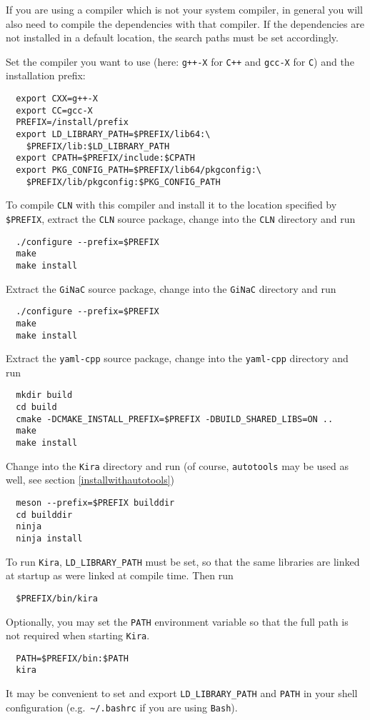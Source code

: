 \documentclass[a4paper,12pt]{article}
\newcommand*{\kira}{\texttt{Kira}}
\begin{document}
If you are using a compiler which is not your system compiler, in general you
will also need to compile the dependencies with that compiler.
If the dependencies are not installed in a default location, the search paths
must be set accordingly.

Set the compiler you want to use (here: \texttt{g++-X} for \texttt{C++} and
\texttt{gcc-X} for \texttt{C}) and the installation prefix:
%
\begin{verbatim}
  export CXX=g++-X
  export CC=gcc-X
  PREFIX=/install/prefix
  export LD_LIBRARY_PATH=$PREFIX/lib64:\
    $PREFIX/lib:$LD_LIBRARY_PATH
  export CPATH=$PREFIX/include:$CPATH
  export PKG_CONFIG_PATH=$PREFIX/lib64/pkgconfig:\
    $PREFIX/lib/pkgconfig:$PKG_CONFIG_PATH
\end{verbatim}
%
To compile \texttt{CLN} with this compiler and install it to the location
specified by \texttt{\$PREFIX}, extract the \texttt{CLN} source package, change
into the \texttt{CLN} directory and run
%
\begin{verbatim}
  ./configure --prefix=$PREFIX
  make
  make install
\end{verbatim}

\clearpage

\noindent
Extract the \texttt{GiNaC} source package, change into the \texttt{GiNaC}
directory and run
%
\begin{verbatim}
  ./configure --prefix=$PREFIX
  make
  make install
\end{verbatim}
%
Extract the \texttt{yaml-cpp} source package, change into the \texttt{yaml-cpp}
directory and run
%
\begin{verbatim}
  mkdir build
  cd build
  cmake -DCMAKE_INSTALL_PREFIX=$PREFIX -DBUILD_SHARED_LIBS=ON ..
  make
  make install
\end{verbatim}
%
Change into the \texttt{\kira{}} directory and run (of course,
\texttt{autotools} may be used as well, see section \ref{installwithautotools})
%
\begin{verbatim}
  meson --prefix=$PREFIX builddir
  cd builddir
  ninja
  ninja install
\end{verbatim}
%
To run \texttt{\kira{}}, \texttt{LD\_LIBRARY\_PATH} must be set, so that the same
libraries are linked at startup as were linked at compile time.
Then run
%
\begin{verbatim}
  $PREFIX/bin/kira
\end{verbatim}
%
Optionally, you may set the \texttt{PATH} environment variable so that the full
path is not required when starting \kira{}.
%
\begin{verbatim}
  PATH=$PREFIX/bin:$PATH
  kira
\end{verbatim}
%
It may be convenient to set and export \texttt{LD\_LIBRARY\_PATH} and
\texttt{PATH} in your shell configuration
(e.g.\ \texttt{\textasciitilde{}/.bashrc} if you are using \texttt{Bash}).



\clearpage

% 

\end{document}
